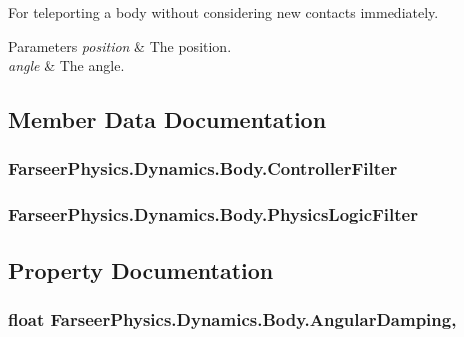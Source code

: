 For teleporting a body without considering new contacts immediately. 


\begin{DoxyParams}{Parameters}
{\em position} & The position.\\
\hline
{\em angle} & The angle.\\
\hline
\end{DoxyParams}


\subsection{Member Data Documentation}
\hypertarget{class_farseer_physics_1_1_dynamics_1_1_body_a38ed721c44280d3752f9fa44df47d9fb}{
\subsubsection[{Controller\+Filter}]{ Farseer\+Physics.\+Dynamics.\+Body.\+Controller\+Filter}}\label{class_farseer_physics_1_1_dynamics_1_1_body_a38ed721c44280d3752f9fa44df47d9fb}
\hypertarget{class_farseer_physics_1_1_dynamics_1_1_body_a9c8ca7305a43003e26afc43e1fa88e22}{
\subsubsection[{Physics\+Logic\+Filter}]{ Farseer\+Physics.\+Dynamics.\+Body.\+Physics\+Logic\+Filter}}\label{class_farseer_physics_1_1_dynamics_1_1_body_a9c8ca7305a43003e26afc43e1fa88e22}


\subsection{Property Documentation}
\hypertarget{class_farseer_physics_1_1_dynamics_1_1_body_a1c0b5c20a655be9ffeccf19eea6def1c}{
\subsubsection[{Angular\+Damping}]{\setlength{\rightskip}{0pt plus 5cm}float Farseer\+Physics.\+Dynamics.\+Body.\+Angular\+Damping\hspace{0.3cm}{\ttfamily [get]}, {\ttfamily [set]}}}\label{class_farseer_physics_1_1_dynamics_1_1_body_a1c0b5c20a655be9ffeccf19eea6def1c}



